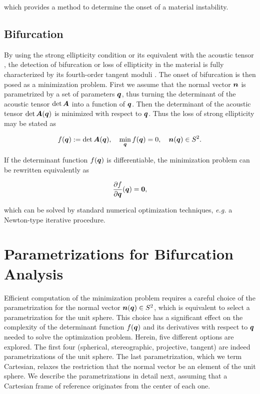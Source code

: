 \documentclass[12pt]{article}
\numberwithin{equation}{section}
\begin{document}
which provides a method to determine the onset of a material
instability.

\subsection{Bifurcation}

By using the strong ellipticity condition
 or its equivalent with the acoustic
tensor , the detection of bifurcation
or loss of ellipticity in the material is fully characterized by its
fourth-order tangent moduli . The
onset of bifurcation is then posed as a minimization problem.  First
we assume that the normal vector ${\boldsymbol{n}}$ is parametrized by a set of
parameters ${\boldsymbol{q}}$, thus turning the determinant of the acoustic tensor
$\det {\boldsymbol{A}}$ into a function of ${\boldsymbol{q}}$.  Then the determinant of the
acoustic tensor $\det {\boldsymbol{A}}({\boldsymbol{q}})$ is minimized with respect to
${\boldsymbol{q}}$. Thus the loss of strong ellipticity may be stated as

\begin{equation} \label{eq:minimization-determinant}
  f({\boldsymbol{q}}) := \det {\boldsymbol{A}}({\boldsymbol{q}}),
  \quad
  \min_{{\boldsymbol{q}}} f({\boldsymbol{q}}) = 0,
  \quad
  {\boldsymbol{n}}({\boldsymbol{q}}) \in S^2.
\end{equation}

If the determinant function $f({\boldsymbol{q}})$ is differentiable, the
minimization problem can be rewritten equivalently as

\begin{equation}\label{eq:minimization-derivative}
  \frac{\partial f}{\partial {\boldsymbol{q}}}({\boldsymbol{q}}) = \mathbf{0},
\end{equation}

which can be solved by standard numerical optimization techniques,
\emph{e.g.} a Newton-type iterative procedure.

\section{Parametrizations for Bifurcation Analysis}
\label{sec:parametrizations}

Efficient computation of the minimization problem
 requires a careful choice of the
parametrization for the normal vector ${\boldsymbol{n}}({\boldsymbol{q}}) \in S^2$, which is
equivalent to select a parametrization for the unit sphere. This
choice has a significant effect on the complexity of the determinant
function $f({\boldsymbol{q}})$ and its derivatives with respect to ${\boldsymbol{q}}$ needed to
solve the optimization problem. Herein, five different options are
explored. The first four (spherical, stereographic, projective,
tangent) are indeed parametrizations of the unit sphere.  The last
parametrization, which we term Cartesian, relaxes the restriction that
the normal vector be an element of the unit sphere. We describe the
parametrizations in detail next, assuming that a Cartesian frame of
reference originates from the center of each one.
\end{document}
